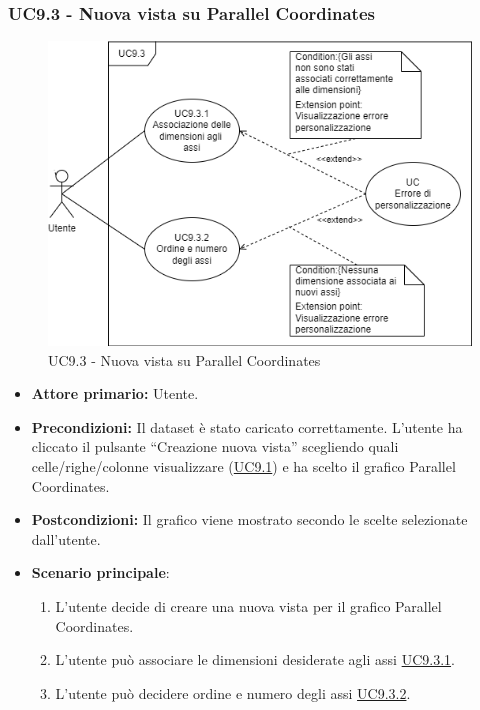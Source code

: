 \subsubsection{UC9.3 - Nuova vista su Parallel Coordinates}
\label{sec:UC9.3}
\begin{figure}[h!]
	\centering
	\includegraphics[scale=0.55]{../../assets/creazionevista_parallel_coordinates.png}
	\caption{UC9.3 - Nuova vista su Parallel Coordinates}
\end{figure}
\begin{itemize}
    \item \textbf{Attore primario:} Utente.
    \item \textbf{Precondizioni:} Il dataset è stato caricato correttamente. L'utente ha cliccato il pulsante ``Creazione nuova vista'' scegliendo quali celle/righe/colonne visualizzare (\hyperref[sec:UC9.1]{UC9.1}) e ha scelto il grafico Parallel Coordinates.
    \item \textbf{Postcondizioni:} Il grafico viene mostrato secondo le scelte selezionate dall'utente.
    \item \textbf{Scenario principale}:
    \begin{enumerate}
		\item L'utente decide di creare una nuova vista per il grafico Parallel Coordinates.
		\item L'utente può associare le dimensioni desiderate agli assi \hyperref[sec:UC9.3.1]{UC9.3.1}.
		\item L'utente può decidere ordine e numero degli assi \hyperref[sec:UC9.3.2]{UC9.3.2}.
	\end{enumerate}
\end{itemize}

